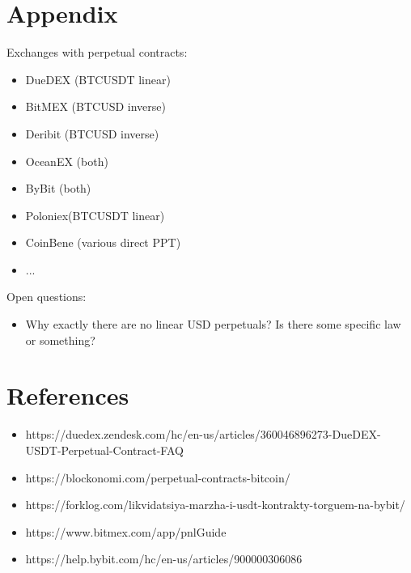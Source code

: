\documentclass{article}
\begin{document}
\section{Appendix}
Exchanges with perpetual contracts:

\begin{itemize}
\item DueDEX (BTCUSDT linear)
\item BitMEX (BTCUSD inverse)
\item Deribit (BTCUSD inverse)
\item OceanEX (both)
\item ByBit (both)
\item Poloniex(BTCUSDT linear)
\item CoinBene (various direct PPT)
\item ...
\end{itemize}


Open questions:
\begin{itemize}
\item Why exactly there are no linear USD perpetuals? Is there some specific law or something?
\end{itemize}


\section{References}
\begin{itemize}
\item https://duedex.zendesk.com/hc/en-us/articles/360046896273-DueDEX-USDT-Perpetual-Contract-FAQ
\item https://blockonomi.com/perpetual-contracts-bitcoin/
\item https://forklog.com/likvidatsiya-marzha-i-usdt-kontrakty-torguem-na-bybit/
\item https://www.bitmex.com/app/pnlGuide
\item https://help.bybit.com/hc/en-us/articles/900000306086
\end{itemize}
\end{document}

